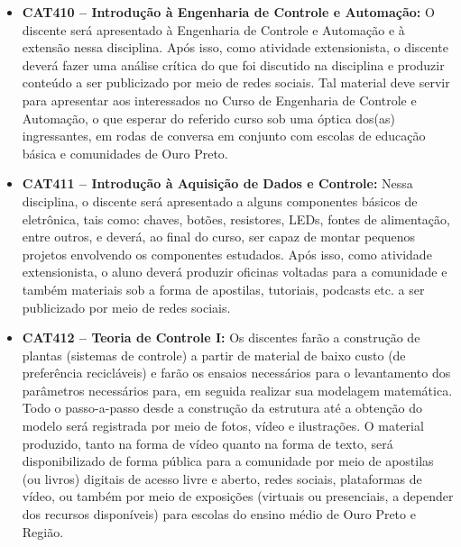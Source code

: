 \documentclass[
	12pt,				%
	openright,			%
	oneside,			%
	a4paper,			%
	english,			%
	brazil				%
	]{abntex2}
\begin{document}
\begin{itemize}
    \item \textbf{CAT410 -- Introdução à Engenharia de Controle e Automação:} O discente  será apresentado à Engenharia de Controle e Automação e à extensão nessa disciplina. Após isso, como atividade extensionista, o discente deverá fazer uma análise crítica do que foi discutido na disciplina e produzir conteúdo a ser publicizado por meio de redes sociais. Tal material deve servir para apresentar aos interessados no Curso de Engenharia de Controle e Automação, o que esperar do referido curso sob uma óptica dos(as) ingressantes, em rodas de conversa em conjunto com escolas de educação básica e comunidades de Ouro Preto.

    \item \textbf{CAT411 -- Introdução à Aquisição de Dados e Controle:} Nessa disciplina, o discente será apresentado a alguns componentes básicos de eletrônica, tais como: chaves, botões, resistores, LEDs, fontes de alimentação, entre outros, e deverá, ao final do curso, ser capaz de montar pequenos projetos envolvendo os componentes estudados. Após isso, como atividade extensionista, o aluno deverá produzir oficinas voltadas para a comunidade e também materiais sob a forma de apostilas, tutoriais, podcasts etc. a ser publicizado por meio de redes sociais.

    \item \textbf{CAT412 -- Teoria de Controle I:} Os discentes farão a construção de plantas (sistemas de controle) a partir de material de baixo custo (de preferência recicláveis) e farão os ensaios necessários para o levantamento dos parâmetros necessários para, em seguida realizar sua modelagem matemática. Todo o passo-a-passo desde a construção da estrutura até a obtenção do modelo será registrada por meio de fotos, vídeo e ilustrações. O material produzido, tanto na forma de vídeo quanto na forma de texto, será disponibilizado de forma pública para a comunidade por meio de apostilas (ou livros) digitais de acesso livre e aberto, redes sociais, plataformas de vídeo, ou também por meio de exposições (virtuais ou presenciais, a depender dos recursos disponíveis) para escolas do ensino médio de Ouro Preto e Região.


\end{itemize}
\end{document}
